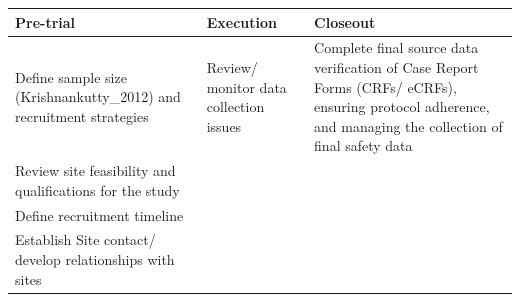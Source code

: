 \documentclass[]{book}
\theoremstyle{definition}
\theoremstyle{definition}
\theoremstyle{definition}
\theoremstyle{remark}
\begin{document}
\begin{longtable}[]{@{}lll@{}}
\toprule
\begin{minipage}[b]{0.27\columnwidth}\raggedright\strut
\textbf{Pre-trial}\strut
\end{minipage} & \begin{minipage}[b]{0.33\columnwidth}\raggedright\strut
\textbf{Execution}\strut
\end{minipage} & \begin{minipage}[b]{0.30\columnwidth}\raggedright\strut
\textbf{Closeout}\strut
\end{minipage}\tabularnewline
\midrule
\endhead
\begin{minipage}[t]{0.27\columnwidth}\raggedright\strut
Define sample size (Krishnankutty\_2012) and recruitment
strategies\strut
\end{minipage} & \begin{minipage}[t]{0.33\columnwidth}\raggedright\strut
Review/ monitor data collection issues\strut
\end{minipage} & \begin{minipage}[t]{0.30\columnwidth}\raggedright\strut
Complete final source data verification of Case Report Forms (CRFs/
eCRFs), ensuring protocol adherence, and managing the collection of
final safety data\strut
\end{minipage}\tabularnewline
\begin{minipage}[t]{0.27\columnwidth}\raggedright\strut
Review site feasibility and qualifications for the study\strut
\end{minipage} & \begin{minipage}[t]{0.33\columnwidth}\raggedright\strut
\strut
\end{minipage} & \begin{minipage}[t]{0.30\columnwidth}\raggedright\strut
\strut
\end{minipage}\tabularnewline
\begin{minipage}[t]{0.27\columnwidth}\raggedright\strut
Define recruitment timeline\strut
\end{minipage} & \begin{minipage}[t]{0.33\columnwidth}\raggedright\strut
\strut
\end{minipage} & \begin{minipage}[t]{0.30\columnwidth}\raggedright\strut
\strut
\end{minipage}\tabularnewline
\begin{minipage}[t]{0.27\columnwidth}\raggedright\strut
Establish Site contact/ develop relationships with sites\strut

\end{minipage}
\end{longtable}
\end{document}
